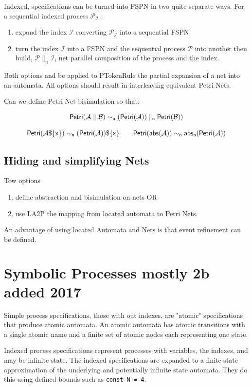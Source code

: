 \documentclass[]{article}
\begin{document}
{Indexed, specifications can be turned into FSPN in two quite separate ways. For a sequential indexed process $\mathcal{P_I}$ :
\begin{enumerate}
\item expand the  index $\mathcal{I}$ converting $\mathcal{P_I}$ into  a sequential FSPN
\item turn the index $\mathcal{I}$ into a FSPN and the sequential process $\mathcal{P}$  into another  then build, $\mathcal{P}\parallel_n \mathcal{I}$,  net parallel composition of  the process and the index. 
\end{enumerate}
Both options and be applied to  {\sf PTokenRule} the partial expansion of a net into an automata.
All options  should result in interleaving equivalent Petri Nets.

Can we define Petri Net bisimulation so that:

\[{\sf Petri(\mathcal{A}\parallel \mathcal{B} ) \sim_n  (Petri(\mathcal{A}))\parallel_n Petri(\mathcal{B}))   }\]  

\[{\sf Petri(\mathcal{A}\$\{x\}) \sim_n  (Petri(\mathcal{A}))\$\{x\}  \qquad     Petri(abs(\mathcal{A}))\sim_n  abs_n(Petri(\mathcal{A})) }\]  


\subsection{Hiding and simplifying  Nets}
Tow options
\begin{enumerate}
\item define abstraction and bisimulation on nets OR
\item use {\sf LA2P} the mapping from located automata to Petri Nets. 
\end{enumerate}
An advantage of using located Automata and Nets is that event refinement can be defined.

}
\section{ Symbolic Processes  {\color{red} mostly 2b added 2017}}
Simple process specifications, those with out indexes, are "atomic" specifications that produce atomic automata.   An atomic  automata has atomic transitions with  a single atomic name and  a finite set of  atomic  nodes each   representing  one state.  

Indexed process specifications represent processes with variables, the indexes, and may be infinite state. The indexed specifications are expanded to a finite state approximation of the underlying and potentially infinite state automata. They do this using defined bounds such as \verb|const N = 4|.
\end{document}

